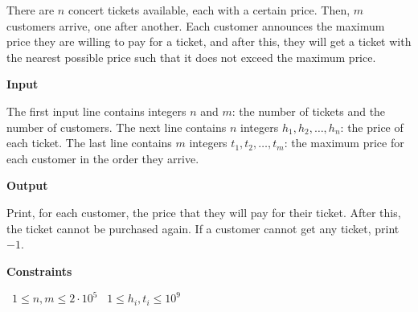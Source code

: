 There are $n$ concert tickets available, each with a certain price. Then, $m$ customers arrive, one after another.
Each customer announces the maximum price they are willing to pay for a ticket, and after this, they will get a ticket with the nearest possible price such that it does not exceed the maximum price.

\vspace{0.3cm}\noindent\textbf{Input}

The first input line contains integers $n$ and $m$: the number of tickets and the number of customers.
The next line contains $n$ integers $h_1,h_2,\ldots,h_n$: the price of each ticket.
The last line contains $m$ integers $t_1,t_2,\ldots,t_m$: the maximum price for each customer in the order they arrive.

\vspace{0.3cm}\noindent\textbf{Output}

Print, for each customer, the price that they will pay for their ticket. After this, the ticket cannot be purchased again.
If a customer cannot get any ticket, print $-1$.

\vspace{0.3cm}\noindent\textbf{Constraints}

\textbullet\ $1 \le n, m \le 2 \cdot 10^5$
\textbullet\ $1 \le h_i, t_i \le 10^9$